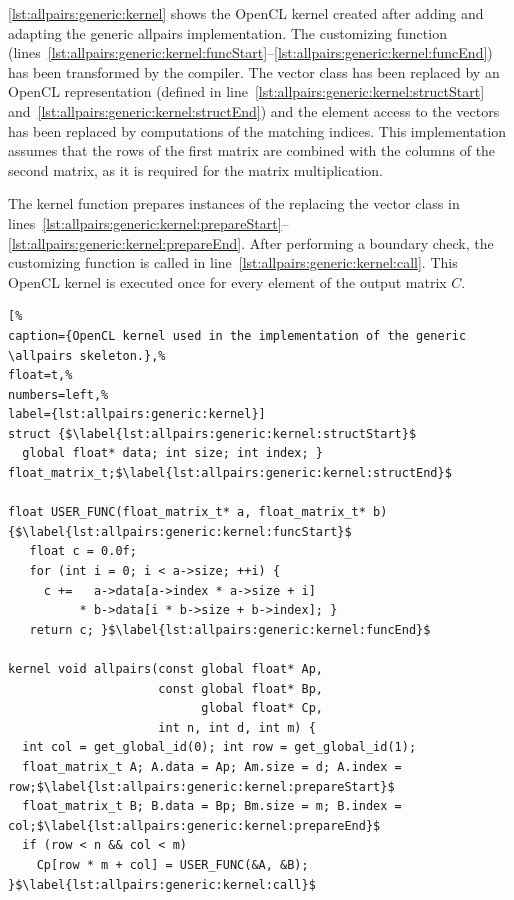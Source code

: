 \autoref{lst:allpairs:generic:kernel} shows the OpenCL kernel created after adding and adapting the generic allpairs implementation.
The customizing function (lines~\ref{lst:allpairs:generic:kernel:funcStart}--\ref{lst:allpairs:generic:kernel:funcEnd}) has been transformed by the  compiler.
The vector class has been replaced by an OpenCL representation (defined in line~\ref{lst:allpairs:generic:kernel:structStart} and~\ref{lst:allpairs:generic:kernel:structEnd}) and the element access to the vectors has been replaced by computations of the matching indices.
This implementation assumes that the rows of the first matrix are combined with the columns of the second matrix, as it is required for the matrix multiplication.

The  kernel function prepares instances of the  replacing the vector class in lines~\ref{lst:allpairs:generic:kernel:prepareStart}--\ref{lst:allpairs:generic:kernel:prepareEnd}.
After performing a boundary check, the customizing function is called in line~\ref{lst:allpairs:generic:kernel:call}.
This OpenCL kernel is executed once for every element of the output matrix $C$.

\begin{lstlisting}[%                                                             
caption={OpenCL kernel used in the implementation of the generic \allpairs skeleton.},%
float=t,%                                                                       
numbers=left,%
label={lst:allpairs:generic:kernel}]
struct {$\label{lst:allpairs:generic:kernel:structStart}$
  global float* data; int size; int index; } float_matrix_t;$\label{lst:allpairs:generic:kernel:structEnd}$

float USER_FUNC(float_matrix_t* a, float_matrix_t* b) {$\label{lst:allpairs:generic:kernel:funcStart}$
   float c = 0.0f;
   for (int i = 0; i < a->size; ++i) {
     c +=   a->data[a->index * a->size + i]
          * b->data[i * b->size + b->index]; }
   return c; }$\label{lst:allpairs:generic:kernel:funcEnd}$

kernel void allpairs(const global float* Ap,
                     const global float* Bp,
                           global float* Cp,
                     int n, int d, int m) {
  int col = get_global_id(0); int row = get_global_id(1);
  float_matrix_t A; A.data = Ap; Am.size = d; A.index = row;$\label{lst:allpairs:generic:kernel:prepareStart}$
  float_matrix_t B; B.data = Bp; Bm.size = m; B.index = col;$\label{lst:allpairs:generic:kernel:prepareEnd}$
  if (row < n && col < m)
    Cp[row * m + col] = USER_FUNC(&A, &B); }$\label{lst:allpairs:generic:kernel:call}$
\end{lstlisting}

